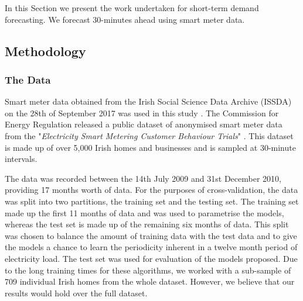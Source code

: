 In this Section we present the work undertaken for short-term demand forecasting. We forecast 30-minutes ahead using smart meter data. 

\subsection{Methodology}
\subsubsection{The Data}


Smart meter data obtained from the Irish Social Science Data Archive (ISSDA) on the 28th of September 2017 was used in this study \cite{cer_2012}. The Commission for Energy Regulation released a public dataset of anonymised smart meter data from the "\textit{Electricity Smart Metering Customer Behaviour Trials}" \cite{cer_2012}. This dataset is made up of over 5,000 Irish homes and businesses and is sampled at 30-minute intervals.

The data was recorded between the 14th July 2009 and 31st December 2010, providing 17 months worth of data. For the purposes of cross-validation, the data was split into two partitions, the training set and the testing set. The training set made up the first 11 months of data and was used to parametrise the models, whereas the test set is made up of the remaining six months of data. This split was chosen to balance the amount of training data with the test data and to give the models a chance to learn the periodicity inherent in a twelve month period of electricity load. The test set was used for evaluation of the models proposed. Due to the long training times for these algorithms, we worked with a sub-sample of 709 individual Irish homes from the whole dataset. However, we believe that our results would hold over the full dataset.

